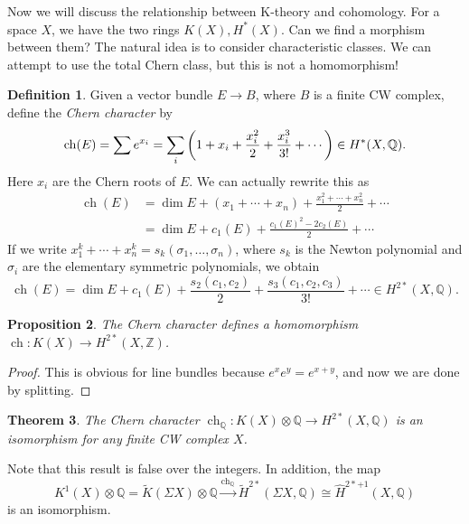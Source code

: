 \documentclass[leqno, openany]{memoir}
\newtheorem{thm}{Theorem}[section]
\newtheorem{prop}[thm]{Proposition}
\theoremstyle{definition}
\newtheorem{defn}[thm]{Definition}
\theoremstyle{remark}
\theoremstyle{plain}
\theoremstyle{definition}
\theoremstyle{remark}
\newcommand{\Z}{\mathbb{Z}}
\newcommand{\Q}{\mathbb{Q}}
\newcommand{\wt}[1]{\widetilde{#1}}
\newcommand{\wh}[1]{\widehat{#1}}
\DeclareMathOperator{\ch}{ch}
\begin{document}
Now we will discuss the relationship between K-theory and cohomology. For a
space $X$, we have the two rings $K(X), H^*(X)$. Can we find a morphism between
them? The natural idea is to consider characteristic classes. We can attempt to
use the total Chern class, but this is not a homomorphism!

\begin{defn} Given a vector bundle $E \to B$, where $B$ is a finite CW complex,
    define the \textit{Chern character} by \[ \ch(E) = \sum e^{x_i} = \sum_i
    \qty(1 + x_i + \frac{x_i^2}{2} + \frac{x_i^3}{3!} + \cdots) \in H^*(X, \Q).
\] Here $x_i$ are the Chern roots of $E$. We can actually rewrite this as
\begin{align*} \ch(E) &= \dim E + (x_1 + \cdots + x_n) + \frac{x_1^2 + \cdots +
x_n^2}{2} + \cdots \\ &= \dim E + c_1(E) + \frac{{c_1(E)}^2 - 2 c_2(E)}{2} +
\cdots \end{align*} If we write $x_1^k + \cdots + x_n^k = s_k(\sigma_1, \ldots,
\sigma_n)$, where $s_k$ is the Newton polynomial and $\sigma_i$ are the
elementary symmetric polynomials, we obtain \[ \ch(E) = \dim E + c_1(E) +
\frac{s_2(c_1, c_2)}{2} + \frac{s_3(c_1, c_2, c_3)}{3!} + \cdots \in H^{2*}(X,
\Q). \] \end{defn}

\begin{prop} The Chern character defines a homomorphism $\ch \colon K(X) \to
H^{2*}(X, \Z)$.  \end{prop}

\begin{proof} This is obvious for line bundles because $e^x e^y = e^{x+y}$, and
now we are done by splitting.  \end{proof}

\begin{thm} The Chern character $\ch_{\Q} \colon K(X) \otimes \Q \to H^{2*}(X,
\Q)$ is an isomorphism for any finite CW complex $X$.  \end{thm}

Note that this result is false over the integers. In addition, the map \[
K^1(X) \otimes \Q = \wt{K}(\Sigma X) \otimes \Q \xrightarrow{\ch_{\Q}}
\wt{H}^{2*}(\Sigma X, \Q) \cong \wh{H}^{2*+1}(X, \Q) \] is an isomorphism.
\end{document}
